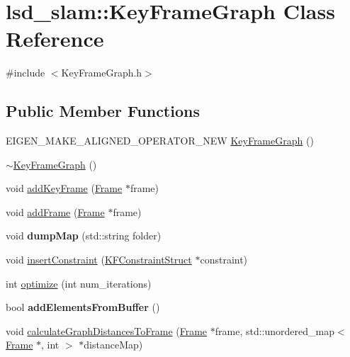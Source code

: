 \hypertarget{classlsd__slam_1_1_key_frame_graph}{\section{lsd\-\_\-slam\-:\-:Key\-Frame\-Graph Class Reference}
\label{classlsd__slam_1_1_key_frame_graph}
}


{\ttfamily \#include $<$Key\-Frame\-Graph.\-h$>$}

\subsection*{Public Member Functions}
\begin{DoxyCompactItemize}
\item 
E\-I\-G\-E\-N\-\_\-\-M\-A\-K\-E\-\_\-\-A\-L\-I\-G\-N\-E\-D\-\_\-\-O\-P\-E\-R\-A\-T\-O\-R\-\_\-\-N\-E\-W \hyperlink{classlsd__slam_1_1_key_frame_graph_a998e4c0fe64cb8f8aa59163cc68bf176}{Key\-Frame\-Graph} ()
\item 
\hyperlink{classlsd__slam_1_1_key_frame_graph_a0fb3ba7d0f694dce13c9da32a47f09fd}{$\sim$\-Key\-Frame\-Graph} ()
\item 
void \hyperlink{classlsd__slam_1_1_key_frame_graph_a3a8b7205a3f3e8702bf4c74abd7fccf5}{add\-Key\-Frame} (\hyperlink{classlsd__slam_1_1_frame}{Frame} $\ast$frame)
\item 
void \hyperlink{classlsd__slam_1_1_key_frame_graph_a5e04ab1456118e86090ae4baa736c0d5}{add\-Frame} (\hyperlink{classlsd__slam_1_1_frame}{Frame} $\ast$frame)
\item 
\hypertarget{classlsd__slam_1_1_key_frame_graph_a02a50466a5ff143c8e68cbca1a495efe}{void {\bfseries dump\-Map} (std\-::string folder)}\label{classlsd__slam_1_1_key_frame_graph_a02a50466a5ff143c8e68cbca1a495efe}

\item 
void \hyperlink{classlsd__slam_1_1_key_frame_graph_a0e4cf71471fcea9fc3aa5fab8c3aa2a3}{insert\-Constraint} (\hyperlink{structlsd__slam_1_1_k_f_constraint_struct}{K\-F\-Constraint\-Struct} $\ast$constraint)
\item 
int \hyperlink{classlsd__slam_1_1_key_frame_graph_a222149dbc9f7a35bb5e97d6aa6580b14}{optimize} (int num\-\_\-iterations)
\item 
\hypertarget{classlsd__slam_1_1_key_frame_graph_aa99125c2838d861bf5737ee9b9568d89}{bool {\bfseries add\-Elements\-From\-Buffer} ()}\label{classlsd__slam_1_1_key_frame_graph_aa99125c2838d861bf5737ee9b9568d89}

\item 
void \hyperlink{classlsd__slam_1_1_key_frame_graph_a01cb0488a64d79a500265d9096b6a014}{calculate\-Graph\-Distances\-To\-Frame} (\hyperlink{classlsd__slam_1_1_frame}{Frame} $\ast$frame, std\-::unordered\-\_\-map$<$ \hyperlink{classlsd__slam_1_1_frame}{Frame} $\ast$, int $>$ $\ast$distance\-Map)
\end{DoxyCompactItemize}
